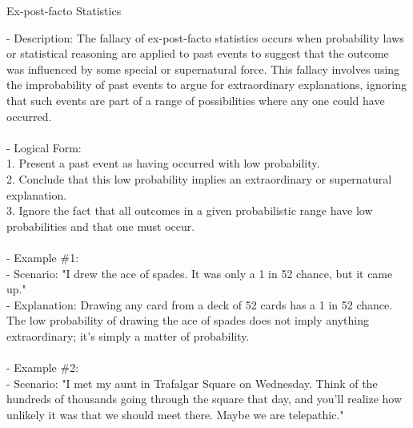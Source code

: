 \documentclass[a4paper,12pt,single,pdftex]{scrbook}
\begin{document}
  

Ex-post-facto Statistics
    
      - Description: The fallacy of ex-post-facto statistics occurs when probability laws or statistical reasoning are applied to past events to suggest that the outcome was influenced by some special or supernatural force. This fallacy involves using the improbability of past events to argue for extraordinary explanations, ignoring that such events are part of a range of possibilities where any one could have occurred.
    \\

    
      
    \\

    
      - Logical Form:
    \\

    
        1. Present a past event as having occurred with low probability.
    \\

    
        2. Conclude that this low probability implies an extraordinary or supernatural explanation.
    \\

    
        3. Ignore the fact that all outcomes in a given probabilistic range have low probabilities and that one must occur.
    \\

    
      
    \\

    
      - Example \#1:
    \\

    
        - Scenario: "I drew the ace of spades. It was only a 1 in 52 chance, but it came up."
    \\

    
        - Explanation: Drawing any card from a deck of 52 cards has a 1 in 52 chance. The low probability of drawing the ace of spades does not imply anything extraordinary; it's simply a matter of probability.
    \\

    
      
    \\

    
      - Example \#2:
    \\

    
        - Scenario: "I met my aunt in Trafalgar Square on Wednesday. Think of the hundreds of thousands going through the square that day, and you’ll realize how unlikely it was that we should meet there. Maybe we are telepathic."
    \\
\end{document}
